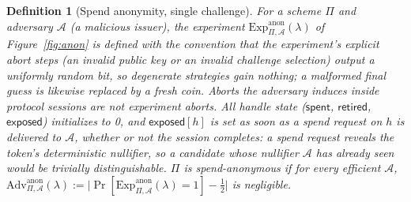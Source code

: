\documentclass[11pt]{article}
\newtheorem{definition}{Definition}
\newcommand{\adv}{\mathcal{A}}
\begin{document}
\begin{definition}[Spend anonymity, single challenge]
\label{def:anon}
For a scheme $\Pi$ and adversary $\adv$ (a malicious issuer), the
experiment $\mathrm{Exp}^{\mathrm{anon}}_{\Pi,\adv}(\lambda)$ of
Figure~\ref{fig:anon} is defined with the convention that the experiment's
explicit abort steps (an invalid public key or an invalid challenge
selection) output a uniformly random bit, so degenerate strategies gain
nothing; a malformed final guess is likewise replaced by a fresh coin.
Aborts the adversary induces \emph{inside} protocol sessions are not
experiment aborts. All handle state ($\mathsf{spent}$, $\mathsf{retired}$,
$\mathsf{exposed}$) initializes to 0, and $\mathsf{exposed}[h]$ is set as
soon as a spend \emph{request} on $h$ is delivered to $\adv$, whether or
not the session completes: a spend request reveals the token's
deterministic nullifier, so a candidate whose nullifier $\adv$ has already
seen would be trivially distinguishable.
$\Pi$ is \emph{spend-anonymous} if for every efficient $\adv$,
$\mathrm{Adv}^{\mathrm{anon}}_{\Pi,\adv}(\lambda) :=
\bigl|\Pr[\mathrm{Exp}^{\mathrm{anon}}_{\Pi,\adv}(\lambda) = 1] -
\tfrac{1}{2}\bigr|$ is negligible.
\end{definition}
\end{document}
